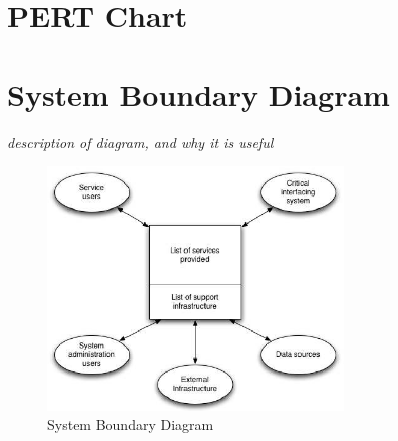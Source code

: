 \section{PERT Chart}


\section{System Boundary Diagram}
\textit{description of diagram, and why it is useful}
\begin{figure}[h]
    \centering
    \includegraphics[width=0.7\textwidth]{images/requirements/system_boundary_diagram.png}
    \caption{System Boundary Diagram}
    \label{fig:sys_boundary_diag}
\end{figure}
